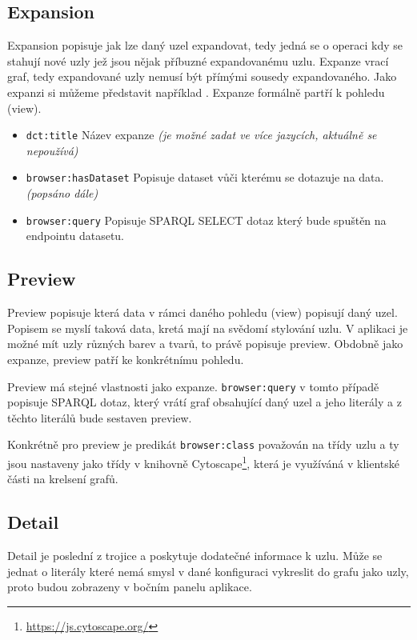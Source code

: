 \subsection{Expansion} \label{pozadavky-expansion}
Expansion popisuje jak lze daný uzel expandovat, tedy jedná se o operaci kdy se stahují nové uzly jež jsou nějak příbuzné expandovanému uzlu. Expanze vrací graf, tedy expandované uzly nemusí být přímými sousedy expandovaného. Jako expanzi si můžeme představit například . Expanze formálně partří k pohledu (view).
\begin{itemize}
    \item \texttt{dct:title} Název expanze \textit{(je možné zadat ve více jazycích, aktuálně se nepoužívá)}
    \item \texttt{browser:hasDataset} Popisuje dataset vůči kterému se dotazuje na data. \textit{(popsáno dále)}
    \item \texttt{browser:query} Popisuje SPARQL SELECT dotaz který bude spuštěn na endpointu datasetu.
\end{itemize}

\subsection{Preview} \label{pozadavky-preview}
Preview popisuje která data v rámci daného pohledu (view) popisují daný uzel. Popisem se myslí taková data, kretá mají na svědomí stylování uzlu. V aplikaci je možné mít uzly různých barev a tvarů, to právě popisuje preview. Obdobně jako expanze, preview patří ke konkrétnímu pohledu.

Preview má stejné vlastnosti jako expanze. \texttt{browser:query} v tomto případě popisuje SPARQL dotaz, který vrátí graf obsahující daný uzel a jeho literály a z těchto literálů bude sestaven preview.

Konkrétně pro preview je predikát \texttt{browser:class} považován na třídy uzlu a ty jsou nastaveny jako třídy v knihovně Cytoscape\footnote{\url{https://js.cytoscape.org/}}, která je využíváná v klientské části na krelsení grafů.

\subsection{Detail} \label{pozadavky-detail}
Detail je poslední z trojice a poskytuje dodatečné informace k uzlu. Může se jednat o literály které nemá smysl v dané konfiguraci vykreslit do grafu jako uzly, proto budou zobrazeny v bočním panelu aplikace.

